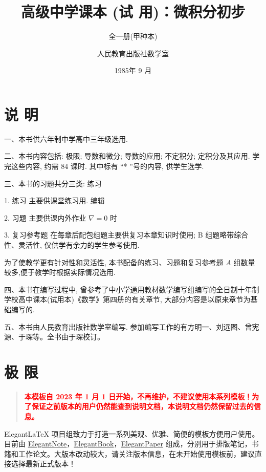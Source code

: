 \documentclass[lang=cn,newtx,10pt,scheme=chinese]{elegantbook}
\title{高级中学课本 (试 用)：微积分初步}
\subtitle{全一册(甲种本)}
\author{人民教育出版社数学室}
\institute{人民教育出版社}
\date{1985年 9 月}
\begin{document}
\maketitle

\chapter*{说 明}


一、本书供六年制中学高中三年级选用.

二、本书内容包括: 极限; 导数和微分; 导数的应用; 不定积分; 定积分及其应用. 学完这些内容, 约需 84 课时. 其中标有 “* ”号的内容, 供学生选学.

三、本书的习题共分三类: 练习

1. 练习 主要供课堂练习用. 编辑

2. 习题 主要供课内外作业 \(\nabla = 0\) 时

3. 复习参考题 在每章后配包组题主要供复习本章知识时使用; B 组题略带综合性、灵活性, 仅供学有余力的学生参考使用.

为了使教学更有针对性和灵活性, 本书配备的练习、习题和复习参考题 \(A\) 组数量较多,便于教学时根据实际情况选用.

四、本书在编写过程中, 曾参考了中小学通用教材数学编写组编写的全日制十年制学校高中课本(试用本)《数学》第四册的有关章节, 大部分内容是以原来章节为基础编写的.

五、本书由人民教育出版社数学室编写. 参加编写工作的有方明一、刘远图、曾宪源、于琛等。全书由于琛校订。

\frontmatter

\tableofcontents

\mainmatter

\chapter{极 限}

\begin{quotation}
	\textbf{\textcolor{red}{本模板自 2023 年 1 月 1 日开始，不再维护，不建议使用本系列模板！为了保证之前版本的用户仍然能查到说明文档，本说明文档仍然保留过去的信息。}}
\end{quotation}

Elegant\LaTeX{} 项目组致力于打造一系列美观、优雅、简便的模板方便用户使用。目前由 \href{https://github.com/ElegantLaTeX/ElegantNote}{ElegantNote}，\href{https://github.com/ElegantLaTeX/ElegantBook}{ElegantBook}，\href{https://github.com/ElegantLaTeX/ElegantPaper}{ElegantPaper} 组成，分别用于排版笔记，书籍和工作论文。大版本改动较大，请关注版本信息，在未开始使用模板前，建议直接选择最新正式版本！
\end{document}
